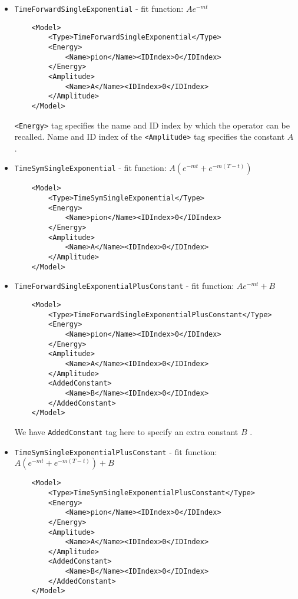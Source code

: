 \documentclass[12pt]{article}
\newcommand{\vb}{\texttt}
\begin{document}
\begin{itemize}
\item \vb{TimeForwardSingleExponential} - fit function: $A e^{-mt}$
\begin{verbatim}
    <Model>
        <Type>TimeForwardSingleExponential</Type>
        <Energy>
            <Name>pion</Name><IDIndex>0</IDIndex>
        </Energy>
        <Amplitude>
            <Name>A</Name><IDIndex>0</IDIndex>
        </Amplitude>
    </Model>
\end{verbatim} 
\vb{<Energy>} tag specifies the name and ID index by which the operator can be recalled.
Name and ID index of the \vb{<Amplitude>} tag specifies the constant $A$ .

\item \vb{TimeSymSingleExponential} - fit function: $A(e^{-mt} + e^{-m(T-t)})$
\begin{verbatim}
    <Model>
        <Type>TimeSymSingleExponential</Type>
        <Energy>
            <Name>pion</Name><IDIndex>0</IDIndex>
        </Energy>
        <Amplitude>
            <Name>A</Name><IDIndex>0</IDIndex>
        </Amplitude>
    </Model>
\end{verbatim}

\item \vb{TimeForwardSingleExponentialPlusConstant} - fit function: $A e^{-mt} + B$
\begin{verbatim}
    <Model>
        <Type>TimeForwardSingleExponentialPlusConstant</Type>
        <Energy>
            <Name>pion</Name><IDIndex>0</IDIndex>
        </Energy>
        <Amplitude>
            <Name>A</Name><IDIndex>0</IDIndex>
        </Amplitude>
        <AddedConstant>
            <Name>B</Name><IDIndex>0</IDIndex>
        </AddedConstant>
    </Model>
\end{verbatim}

We have \vb{AddedConstant} tag here to specify an extra constant $B$ .

\item \vb{TimeSymSingleExponentialPlusConstant} - fit function: $A(e^{-mt} + e^{-m(T-t)} ) + B$
\begin{verbatim}
    <Model>
        <Type>TimeSymSingleExponentialPlusConstant</Type>
        <Energy>
            <Name>pion</Name><IDIndex>0</IDIndex>
        </Energy>
        <Amplitude>
            <Name>A</Name><IDIndex>0</IDIndex>
        </Amplitude>
        <AddedConstant>
            <Name>B</Name><IDIndex>0</IDIndex>
        </AddedConstant>
    </Model>
\end{verbatim}


\end{itemize}
\end{document}
